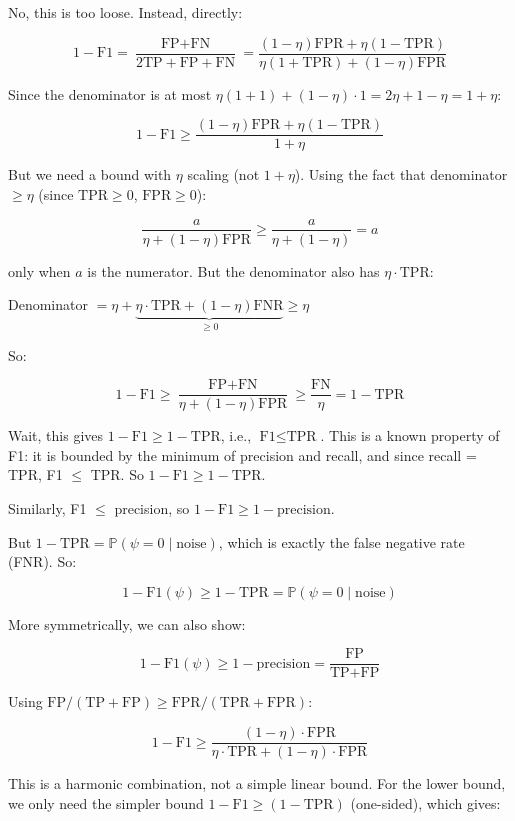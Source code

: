 \documentclass[
  12pt,
]{ctexart}
\begin{document}
No, this is too loose. Instead, directly:

\[1 - \text{F1} = \frac{\text{FP} + \text{FN}}{2\text{TP} + \text{FP} + \text{FN}} = \frac{(1-\eta)\text{FPR} + \eta(1-\text{TPR})}{\eta(1+\text{TPR}) + (1-\eta)\text{FPR}}\]

Since the denominator is at most
\(\eta(1+1) + (1-\eta)\cdot 1 = 2\eta + 1 - \eta = 1 + \eta\):

\[1 - \text{F1} \geq \frac{(1-\eta)\text{FPR} + \eta(1-\text{TPR})}{1 + \eta}\]

But we need a bound with \(\eta\) scaling (not \(1+\eta\)). Using the
fact that denominator \(\geq \eta\) (since \(\text{TPR} \geq 0\),
\(\text{FPR} \geq 0\)):

\[\frac{a}{\eta + (1-\eta)\text{FPR}} \geq \frac{a}{\eta + (1-\eta)} = a\]

only when \(a\) is the numerator. But the denominator also has
\(\eta\cdot\text{TPR}\):

Denominator
\(= \eta + \underbrace{\eta\cdot\text{TPR} + (1-\eta)\text{FNR}}_{\geq 0} \geq \eta\)

So:

\[1 - \text{F1} \geq \frac{\text{FP} + \text{FN}}{\eta + (1-\eta)\text{FPR}} \geq \frac{\text{FN}}{\eta} = 1 - \text{TPR}\]

Wait, this gives \(1 - \text{F1} \geq 1 - \text{TPR}\), i.e.,
\(\text{F1} \leq \text{TPR}\). This is a known property of F1: it is
bounded by the minimum of precision and recall, and since recall = TPR,
F1 \(\leq\) TPR. So \(1 - \text{F1} \geq 1 - \text{TPR}\).

Similarly, F1 \(\leq\) precision, so
\(1 - \text{F1} \geq 1 - \text{precision}\).

But \(1 - \text{TPR} = \mathbb{P}(\psi=0 \mid \text{noise})\), which is
exactly the false negative rate (FNR). So:

\[1 - \text{F1}(\psi) \geq 1 - \text{TPR} = \mathbb{P}(\psi=0 \mid \text{noise})\]

More symmetrically, we can also show:

\[1 - \text{F1}(\psi) \geq 1 - \text{precision} = \frac{\text{FP}}{\text{TP} + \text{FP}}\]

Using
\(\text{FP}/(\text{TP}+\text{FP}) \geq \text{FPR}/(\text{TPR} + \text{FPR})\):

\[1 - \text{F1} \geq \frac{(1-\eta)\cdot\text{FPR}}{\eta\cdot\text{TPR} + (1-\eta)\cdot\text{FPR}}\]

This is a harmonic combination, not a simple linear bound. For the lower
bound, we only need the simpler bound
\(1 - \text{F1} \geq (1 - \text{TPR})\) (one-sided), which gives:
\end{document}
